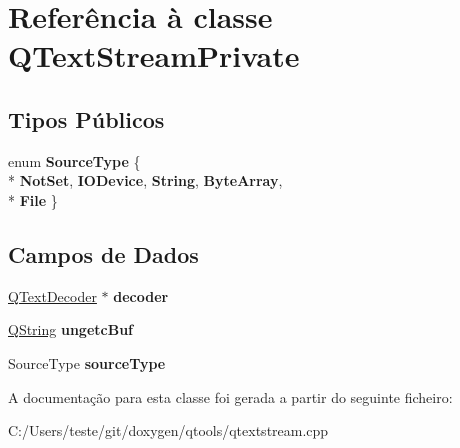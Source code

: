 \hypertarget{class_q_text_stream_private}{\section{Referência à classe Q\-Text\-Stream\-Private}
\label{class_q_text_stream_private}
}
\subsection*{Tipos Públicos}
\begin{DoxyCompactItemize}
\item 
enum {\bfseries Source\-Type} \{ \\*
{\bfseries Not\-Set}, 
{\bfseries I\-O\-Device}, 
{\bfseries String}, 
{\bfseries Byte\-Array}, 
\\*
{\bfseries File}
 \}
\end{DoxyCompactItemize}
\subsection*{Campos de Dados}
\begin{DoxyCompactItemize}
\item 
\hypertarget{class_q_text_stream_private_ac66191a9819a392dd493070d5d70e392}{\hyperlink{class_q_text_decoder}{Q\-Text\-Decoder} $\ast$ {\bfseries decoder}}\label{class_q_text_stream_private_ac66191a9819a392dd493070d5d70e392}

\item 
\hypertarget{class_q_text_stream_private_a931668bbf40a0a899cd7259ef794b739}{\hyperlink{class_q_string}{Q\-String} {\bfseries ungetc\-Buf}}\label{class_q_text_stream_private_a931668bbf40a0a899cd7259ef794b739}

\item 
\hypertarget{class_q_text_stream_private_a5664b1d8c4c86dbbb30dfeddd195e919}{Source\-Type {\bfseries source\-Type}}\label{class_q_text_stream_private_a5664b1d8c4c86dbbb30dfeddd195e919}

\end{DoxyCompactItemize}


A documentação para esta classe foi gerada a partir do seguinte ficheiro\-:\begin{DoxyCompactItemize}
\item 
C\-:/\-Users/teste/git/doxygen/qtools/qtextstream.\-cpp\end{DoxyCompactItemize}
